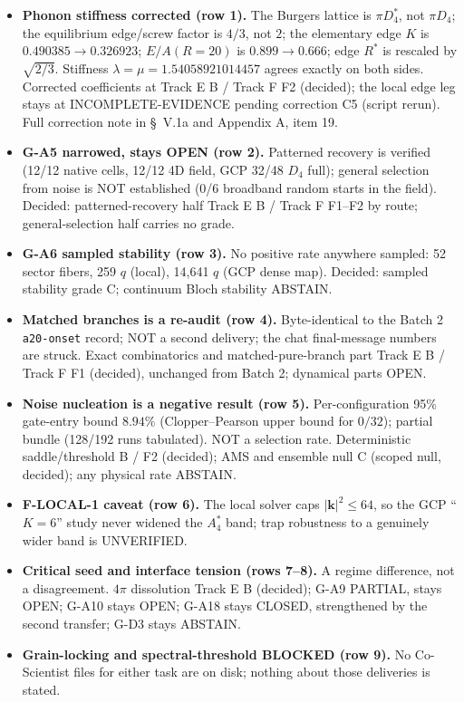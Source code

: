\documentclass[a4paper,11pt]{article}
\begin{document}
\begin{itemize}
\item \textbf{Phonon stiffness corrected (row 1).} The Burgers lattice is $\pi D_4^*$, not $\pi D_4$; the equilibrium edge/screw factor is $4/3$, not $2$; the elementary edge $K$ is $0.490385\to0.326923$; $E/A(R=20)$ is $0.899\to0.666$; edge $R^*$ is rescaled by $\sqrt{2/3}$. Stiffness $\lambda=\mu=1.54058921014457$ agrees exactly on both sides. Corrected coefficients at Track E B / Track F F2 (decided); the local edge leg stays at INCOMPLETE-EVIDENCE pending correction C5 (script rerun). Full correction note in \S~V.1a and Appendix A, item 19.
\item \textbf{G-A5 narrowed, stays OPEN (row 2).} Patterned recovery is verified (12/12 native cells, 12/12 4D field, GCP 32/48 $D_4$ full); general selection from noise is NOT established (0/6 broadband random starts in the field). Decided: patterned-recovery half Track E B / Track F F1--F2 by route; general-selection half carries no grade.
\item \textbf{G-A6 sampled stability (row 3).} No positive rate anywhere sampled: 52 sector fibers, 259 $q$ (local), 14,641 $q$ (GCP dense map). Decided: sampled stability grade C; continuum Bloch stability ABSTAIN.
\item \textbf{Matched branches is a re-audit (row 4).} Byte-identical to the Batch 2 \texttt{a20-onset} record; NOT a second delivery; the chat final-message numbers are struck. Exact combinatorics and matched-pure-branch part Track E B / Track F F1 (decided), unchanged from Batch 2; dynamical parts OPEN.
\item \textbf{Noise nucleation is a negative result (row 5).} Per-configuration 95\% gate-entry bound $8.94\%$ (Clopper--Pearson upper bound for $0/32$); partial bundle (128/192 runs tabulated). NOT a selection rate. Deterministic saddle/threshold B / F2 (decided); AMS and ensemble null C (scoped null, decided); any physical rate ABSTAIN.
\item \textbf{F-LOCAL-1 caveat (row 6).} The local solver caps $|\mathbf{k}|^2\leq64$, so the GCP ``$K=6$'' study never widened the $A_4^*$ band; trap robustness to a genuinely wider band is UNVERIFIED.
\item \textbf{Critical seed and interface tension (rows 7--8).} A regime difference, not a disagreement. $4\pi$ dissolution Track E B (decided); G-A9 PARTIAL, stays OPEN; G-A10 stays OPEN; G-A18 stays CLOSED, strengthened by the second transfer; G-D3 stays ABSTAIN.
\item \textbf{Grain-locking and spectral-threshold BLOCKED (row 9).} No Co-Scientist files for either task are on disk; nothing about those deliveries is stated.

\end{itemize}
\end{document}

